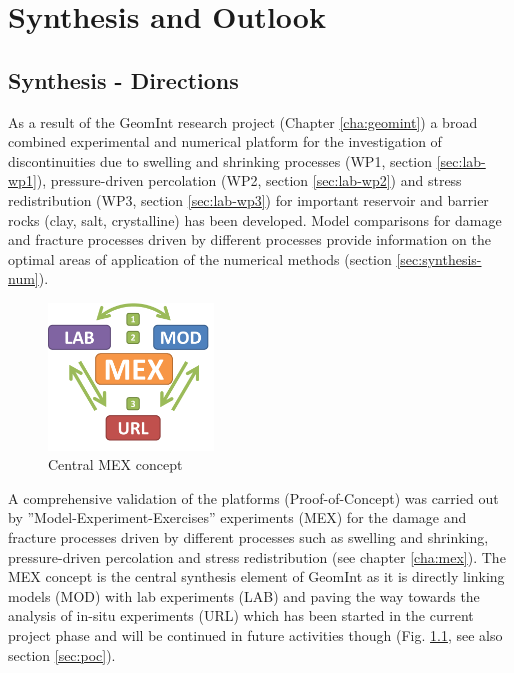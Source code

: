 \chapter{Synthesis and Outlook}
\label{cha:out}


\vspace{-6mm}
\section{Synthesis - Directions}

As a result of the GeomInt research project (Chapter \ref{cha:geomint}) a broad combined experimental and numerical platform for the investigation of discontinuities due to swelling and shrinking processes (WP1, section \ref{sec:lab-wp1}), pressure-driven percolation (WP2, section \ref{sec:lab-wp2}) and stress redistribution (WP3, section \ref{sec:lab-wp3}) for important reservoir and barrier rocks (clay, salt, crystalline) has been developed. Model comparisons for damage and fracture processes driven by different processes provide information on the optimal areas of application of the numerical methods (section \ref{sec:synthesis-num}). 

\begin{figure}
\centering
\includegraphics[width=4.4cm]{figures/geomint-mex.png}
\caption{Central MEX concept}
\label{fig:synthesis-mex}
\end{figure}
A comprehensive validation of the platforms (\glqq{}Proof-of-Concept\grqq) was carried out by ''Model-Experiment-Exercises'' experiments (MEX) for the damage and fracture processes driven by different processes such as swelling and shrinking, pressure-driven percolation and stress redistribution (see chapter \ref{cha:mex}).
The MEX concept is the central synthesis element of GeomInt as it is directly linking models (MOD) with lab experiments (LAB) and paving the way towards the analysis of in-situ experiments (URL) which has been started in the current project phase and will be continued in future activities though (Fig. \ref{fig:synthesis-mex}, see also section \ref{sec:poc}).

